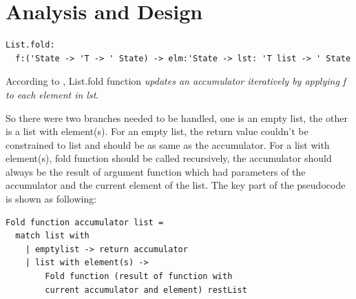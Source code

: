 \documentclass{article}
\begin{document}




\section{Analysis and Design}

\begin{lstlisting}
List.fold: 
  f:('State -> 'T -> ' State) -> elm:'State -> lst: 'T list -> ' State
\end{lstlisting}

According to \cite{sporring2019}, List.fold function \emph{updates an accumulator iteratively by applying f to each element in lst}. 

So there were two branches needed to be handled, one is an empty list, the other is a list with element(s). For an empty list, the return value couldn't be constrained to list and should be as same as the accumulator. For a list with element(s), fold function should be called recursively, the accumulator should always be the result of argument function which had parameters of the accumulator and the current element of the list. The key part of the pseudocode is shown as following:

\begin{lstlisting}
Fold function accumulator list =
  match list with
    | emptylist -> return accumulator
    | list with element(s) -> 
        Fold function (result of function with 
        current accumulator and element) restList
\end{lstlisting}
\end{document}
